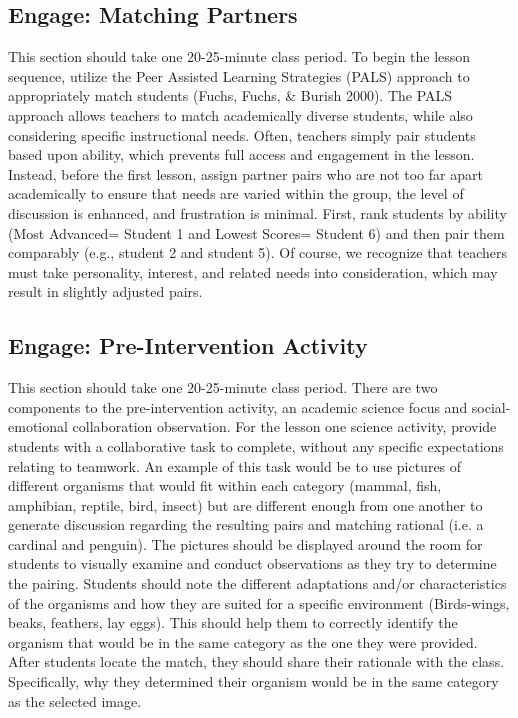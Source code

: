 \documentclass[11pt]{sig-alternate}
\begin{document}
\begin{large}
\subsection*{Engage: Matching Partners }

This section should take one 20-25-minute class period. To begin the lesson sequence, utilize the Peer Assisted Learning Strategies (PALS) approach to appropriately match students (Fuchs, Fuchs, \& Burish 2000). The PALS approach allows teachers to match academically diverse students, while also considering specific instructional needs. Often, teachers simply pair students based upon ability, which prevents full access and engagement in the lesson. Instead, before the first lesson, assign partner pairs who are not too far apart academically to ensure that needs are varied within the group, the level of discussion is enhanced, and frustration is minimal. First, rank students by ability (Most Advanced= Student 1 and Lowest Scores= Student 6) and then pair them comparably (e.g., student 2 and student 5). Of course, we recognize that teachers must take personality, interest, and related needs into consideration, which may result in slightly adjusted pairs.

\subsection*{Engage: Pre-Intervention Activity}

This section should take one 20-25-minute class period. There are two components to the pre-intervention activity, an academic science focus and social-emotional collaboration observation. For the lesson one science activity, provide students with a collaborative task to complete, without any specific expectations relating to teamwork. An example of this task would be to use pictures of different organisms that would fit within each category (mammal, fish, amphibian, reptile, bird, insect) but are different enough from one another to generate discussion regarding the resulting pairs and matching rational (i.e. a cardinal and penguin). The pictures should be displayed around the room for students to visually examine and conduct observations as they try to determine the pairing. Students should note the different adaptations and/or characteristics of the organisms and how they are suited for a specific environment (Birds-wings, beaks, feathers, lay eggs). This should help them to correctly identify the organism that would be in the same category as the one they were provided. After students locate the match, they should share their rationale with the class. Specifically, why they determined their organism would be in the same category as the selected image.


\end{large}
\end{document}
